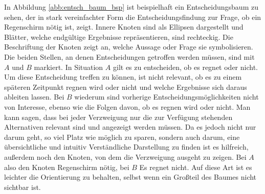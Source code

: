 In Abbildung \ref{abb:entsch_baum_bsp} ist beispielhaft ein Entscheidungsbaum zu sehen, der in stark vereinfachter Form die Entscheidungsfindung zur Frage, ob ein Regenschirm nötig ist, zeigt. Innere Knoten sind als Ellipsen dargestellt und Blätter, welche endgültige Ergebnisse repräsentieren, sind rechteckig. Die Beschriftung der Knoten zeigt an, welche Aussage oder Frage sie symbolisieren. Die beiden Stellen, an denen Entscheidungen getroffen werden müssen, sind mit $A$ und $B$ markiert. In Situation $A$ gilt es zu entscheiden, ob es regnet oder nicht. Um diese Entscheidung treffen zu können, ist nicht relevant, ob es zu einem späteren Zeitpunkt regnen wird oder nicht und welche Ergebnisse sich daraus ableiten lassen. Bei $B$ wiederum sind vorherige Entscheidungsmöglichkeiten nicht von Interesse, ebenso wie die Folgen davon, ob es regnen wird oder nicht. Man kann sagen, dass bei jeder Verzweigung nur die zur Verfügung stehenden Alternativen relevant sind und angezeigt werden müssen. Da es jedoch nicht nur darum geht, so viel Platz wie möglich zu sparen, sondern auch darum, eine übersichtliche und intuitiv Verständliche Darstellung zu finden ist es hilfreich, außerdem noch den Knoten, von dem die Verzweigung ausgeht zu zeigen. Bei $A$ also den Knoten \glqq Regenschirm nötig\grqq , bei $B$ \glqq Es regnet nicht\grqq . Auf diese Art ist es leichter die Orientierung zu behalten, selbst wenn ein Großteil des Baumes nicht sichtbar ist.

